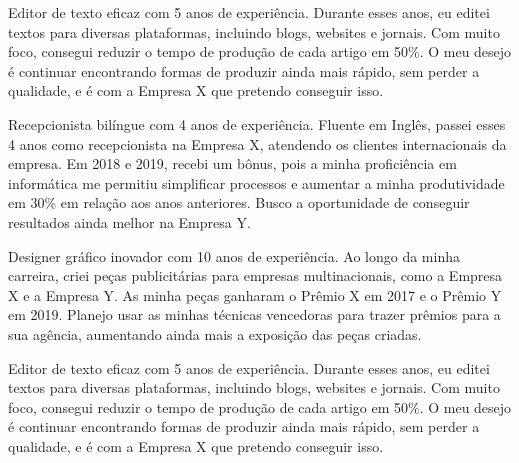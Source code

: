 \begin{commentE}
  Editor de texto eficaz com 5 anos de experiência. Durante esses anos, eu editei textos para diversas plataformas, incluindo blogs, websites e jornais. Com muito foco, consegui reduzir o tempo de produção de cada artigo em 50\%. O meu desejo é continuar encontrando formas de produzir ainda mais rápido, sem perder a qualidade, e é com a Empresa X que pretendo conseguir isso.
\end{commentE}
\begin{commentF}
  Recepcionista bilíngue com 4 anos de experiência. Fluente em Inglês, passei esses 4 anos como recepcionista na Empresa X, atendendo os clientes internacionais da empresa. Em 2018 e 2019, recebi um bônus, pois a minha proficiência em informática me permitiu simplificar processos e aumentar a minha produtividade em 30\% em relação aos anos anteriores. Busco a oportunidade de conseguir resultados ainda melhor na Empresa Y.
\end{commentF}
\begin{commentG}
  Designer gráfico inovador com 10 anos de experiência. Ao longo da minha carreira, criei peças publicitárias para empresas multinacionais, como a Empresa X e a Empresa Y. As minha peças ganharam o Prêmio X em 2017 e o Prêmio Y em 2019. Planejo usar as minhas técnicas vencedoras para trazer prêmios para a sua agência, aumentando ainda mais a exposição das peças criadas.
\end{commentG}
\begin{commentH}
  Editor de texto eficaz com 5 anos de experiência. Durante esses anos, eu editei textos para diversas plataformas, incluindo blogs, websites e jornais. Com muito foco, consegui reduzir o tempo de produção de cada artigo em 50\%. O meu desejo é continuar encontrando formas de produzir ainda mais rápido, sem perder a qualidade, e é com a Empresa X que pretendo conseguir isso.
\end{commentH}
\begin{commentI}
%

\end{commentI}
